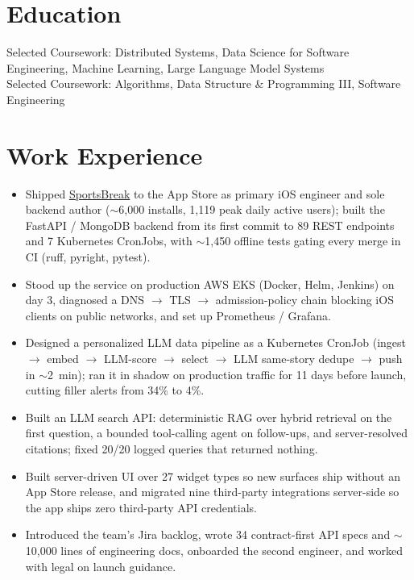 \documentclass[11pt, letterpaper]{article}
\begin{document}

\section{Education}
Selected Coursework: Distributed Systems, Data Science for Software Engineering, Machine Learning, Large Language Model Systems\\[1pt]
Selected Coursework: Algorithms, Data Structure \& Programming III, Software Engineering

\section{Work Experience}
\begin{itemize}
  \item Shipped \href{https://apps.apple.com/app/id6762649287}{SportsBreak} to the App Store as primary iOS engineer and sole backend author ($\sim$6{,}000 installs, 1{,}119 peak daily active users); built the FastAPI / MongoDB backend from its first commit to 89 REST endpoints and 7 Kubernetes CronJobs, with $\sim$1{,}450 offline tests gating every merge in CI (ruff, pyright, pytest).
  \item Stood up the service on production AWS EKS (Docker, Helm, Jenkins) on day 3, diagnosed a DNS $\to$ TLS $\to$ admission-policy chain blocking iOS clients on public networks, and set up Prometheus / Grafana.
  \item Designed a personalized LLM data pipeline as a Kubernetes CronJob (ingest $\to$ embed $\to$ LLM-score $\to$ select $\to$ LLM same-story dedupe $\to$ push in $\sim$2~min); ran it in shadow on production traffic for 11 days before launch, cutting filler alerts from 34\% to 4\%.
  \item Built an LLM search API: deterministic RAG over hybrid retrieval on the first question, a bounded tool-calling agent on follow-ups, and server-resolved citations; fixed 20/20 logged queries that returned nothing.
  \item Built server-driven UI over 27 widget types so new surfaces ship without an App Store release, and migrated nine third-party integrations server-side so the app ships zero third-party API credentials.
  \item Introduced the team's Jira backlog, wrote 34 contract-first API specs and $\sim$10{,}000 lines of engineering docs, onboarded the second engineer, and worked with legal on launch guidance.
\end{itemize}
\end{document}
